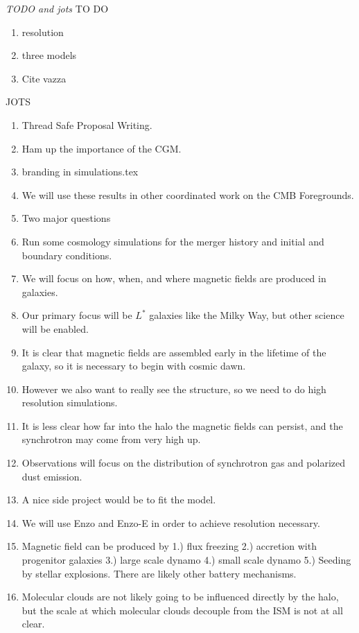 \emph{TODO and jots}
TO DO
\begin{enumerate}
\item resolution
\item three models
\item Cite vazza
\end{enumerate}

JOTS
\begin{enumerate}
\item Thread Safe Proposal Writing.
\item Ham up the importance of the CGM.
\item branding in simulations.tex
\item We will use these results in other coordinated work on the CMB
Foregrounds.
\item Two major questions
\item Run some cosmology simulations for the merger history and initial and
boundary conditions.
\item We will focus on how, when, and where magnetic fields are produced in
galaxies.  
\item Our primary focus will be $L^*$ galaxies like the Milky Way, but other
science will be enabled.
\item It is clear that magnetic fields are assembled early in the lifetime of
the galaxy, so it is necessary to begin with cosmic dawn.
\item However we also want to really see the structure, so we need to do high
resolution simulations.
\item It is less clear how far into the halo the magnetic fields can persist,
and the synchrotron may come from very high up.
\item Observations will focus on the distribution of synchrotron gas and
polarized dust emission.
\item A nice side project would be to fit the \citet{Jansson12} model.
\item We will use Enzo and Enzo-E in order to achieve resolution necessary.
\item Magnetic field can be produced by 1.) flux freezing 2.) accretion with
progenitor galaxies 3.) large scale dynamo 4.) small scale dynamo 5.) Seeding by
stellar explosions.  There are likely other battery mechanisms.
\item Molecular clouds are not likely going to be influenced directly by the
halo, but the scale at which molecular clouds decouple from the ISM is not at
all clear.  
\end{enumerate}
